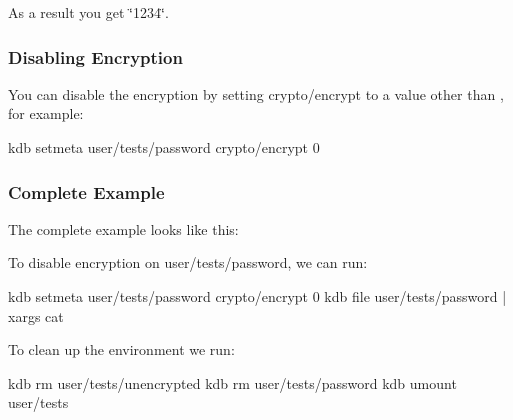 As a result you get \char`\"{}1234\char`\"{}.

\subsubsection*{Disabling Encryption}

You can disable the encryption by setting {\ttfamily crypto/encrypt} to a value other than {}, for example\+:


\begin{DoxyCode}
kdb setmeta user/tests/password crypto/encrypt 0
\end{DoxyCode}


\subsubsection*{Complete Example}

The complete example looks like this\+:




To disable encryption on {\ttfamily user/tests/password}, we can run\+:


\begin{DoxyCode}
kdb setmeta user/tests/password crypto/encrypt 0
kdb file user/tests/password | xargs cat
\end{DoxyCode}


To clean up the environment we run\+:


\begin{DoxyCode}
kdb rm user/tests/unencrypted
kdb rm user/tests/password
kdb umount user/tests
\end{DoxyCode}
 